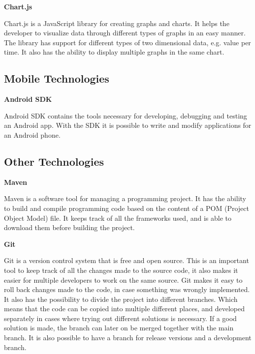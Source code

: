 \textbf{Chart.js} \nocite{Chartjs}

Chart.js is a JavaScript library for creating graphs and charts.
It helps the developer to visualize data through different types of graphs in an easy manner.
The library has support for different types of two dimensional data, e.g. value per time.
It also has the ability to display multiple graphs in the same chart.

\subsection{Mobile Technologies}

\textbf{Android SDK} \nocite{AndroidSDK}

Android SDK contains the tools necessary for developing, debugging and testing an Android app.
With the SDK it is possible to write and modify applications for an Android phone.

\subsection{Other Technologies}

\textbf{Maven} \nocite{Maven}

Maven is a software tool for managing a programming project.
It has the ability to build and compile programming code based on the content of a POM (Project Object Model) file.
It keeps track of all the frameworks used, and is able to download them before building the project.

\textbf{Git} \nocite{Git}

Git is a version control system that is free and open source.
This is an important tool to keep track of all the changes made to the source code, it also makes it easier for multiple developers to work on the same source.
Git makes it easy to roll back changes made to the code, in case something was wrongly implemented.
It also has the possibility to divide the project into different branches.
Which means that the code can be copied into multiple different places, and developed separately in cases where trying out different solutions is necessary.
If a good solution is made, the branch can later on be merged together with the main branch.
It is also possible to have a branch for release versions and a development branch.

